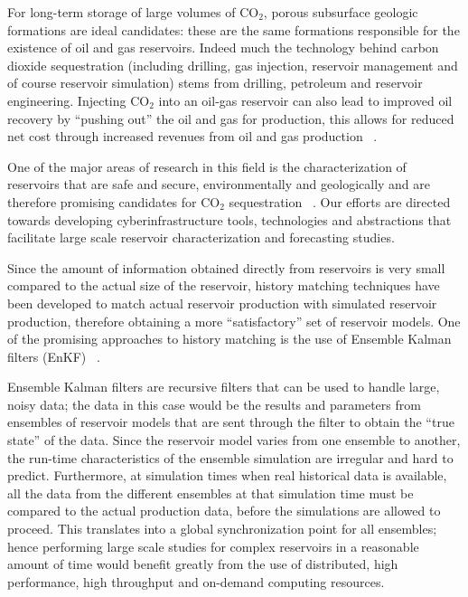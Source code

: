 \documentclass[a4paper,10pt]{article}
\begin{document}
For long-term storage of large volumes of CO$_2$, porous subsurface geologic formations 
are ideal candidates: these are the same 
formations responsible for the existence of oil and gas reservoirs. Indeed much the 
technology behind carbon dioxide sequestration 
(including drilling, gas injection, reservoir management and of course reservoir 
simulation) stems from drilling, petroleum and 
reservoir engineering. Injecting CO$_2$ into an oil-gas reservoir can also lead to 
improved oil recovery by ``pushing out'' the 
oil and gas for production, this allows for reduced net cost through increased revenues 
from oil and gas production ~\cite{EORBook}.

One of the major areas of research in this field is the characterization of reservoirs 
that are safe and secure, environmentally 
and geologically and are therefore promising candidates for CO$_2$ sequestration 
~\cite{GeoRPT,Luigi}. Our efforts are directed 
towards developing cyberinfrastructure tools, technologies and abstractions that 
facilitate large scale reservoir characterization 
and forecasting studies.

Since the amount of information obtained directly from reservoirs is very small compared 
to the actual size of the reservoir, 
history matching techniques have been developed to match actual reservoir production with 
simulated reservoir production, 
therefore obtaining a more ``satisfactory'' set of reservoir models. One of the promising approaches 
to history matching is the use of Ensemble Kalman filters (EnKF) ~\cite{KalmanPaper, 
DO2007, LiEnKF07, DO2006}.

Ensemble Kalman filters are recursive filters that can be used to handle large, noisy 
data; the data in this case would be the results and parameters from ensembles of 
reservoir models that are sent through the filter to obtain the ``true state'' of the 
data. Since the reservoir model varies from one ensemble to another, the run-time 
characteristics of the ensemble simulation are irregular and hard to predict. Furthermore, 
at simulation times when real historical data is available, all the data from the 
different ensembles at that simulation time must be compared to the actual production 
data, before the simulations are allowed to proceed. This translates into a global 
synchronization point for all ensembles; hence performing large scale studies for complex 
reservoirs in a reasonable amount of time would benefit greatly from the use of 
distributed, high performance, high throughput and on-demand computing resources.
\end{document}
